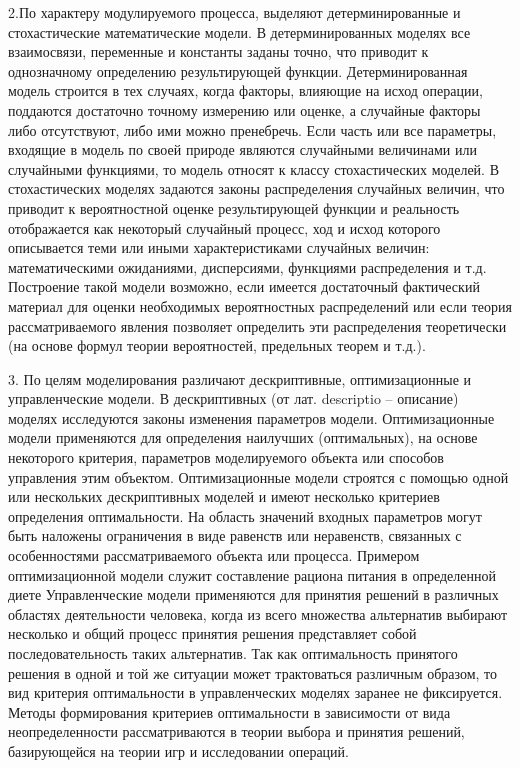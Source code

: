 2.По характеру модулируемого процесса, выделяют  детерминированные и стохастические математические модели. В детерминированных моделях все взаимосвязи, переменные и константы заданы точно, что приводит к однозначному определению результирующей функции. Детерминированная модель строится в тех случаях, когда факторы, влияющие на исход операции, поддаются достаточно точному измерению или оценке, а случайные факторы либо отсутствуют, либо ими можно пренебречь.
Если часть или все параметры, входящие в модель по своей природе являются случайными величинами или случайными функциями, то модель относят к классу стохастических моделей. В стохастических моделях задаются законы распределения случайных величин, что приводит к вероятностной оценке результирующей функции и реальность отображается как некоторый случайный процесс, ход и исход которого описывается теми или иными характеристиками случайных величин: математическими ожиданиями, дисперсиями, функциями распределения и т.д. Построение такой модели возможно, если имеется достаточный фактический материал для оценки необходимых вероятностных распределений или если теория рассматриваемого явления позволяет определить эти распределения теоретически (на основе формул теории вероятностей, предельных теорем и т.д.).


3. По целям моделирования различают дескриптивные, оптимизационные и управленческие модели. В дескриптивных (от лат. descriptio – описание) моделях исследуются законы изменения параметров модели. 
Оптимизационные модели применяются для определения наилучших (оптимальных), на основе некоторого критерия, параметров моделируемого объекта или способов управления этим объектом. Оптимизационные модели строятся с помощью одной или нескольких дескриптивных моделей и имеют несколько критериев определения оптимальности. На область значений входных параметров могут быть наложены ограничения в виде равенств или неравенств, связанных с особенностями рассматриваемого объекта или процесса. Примером оптимизационной модели служит составление рациона питания в определенной диете 
Управленческие модели применяются для принятия решений в различных областях деятельности человека, когда из всего множества альтернатив выбирают несколько и общий процесс принятия решения представляет собой последовательность таких альтернатив. Так как оптимальность принятого решения в одной и той же ситуации может трактоваться различным образом, то вид критерия оптимальности в управленческих моделях заранее не фиксируется. Методы формирования критериев оптимальности в зависимости от вида неопределенности рассматриваются в теории выбора и принятия решений, базирующейся на теории игр и исследовании операций.


